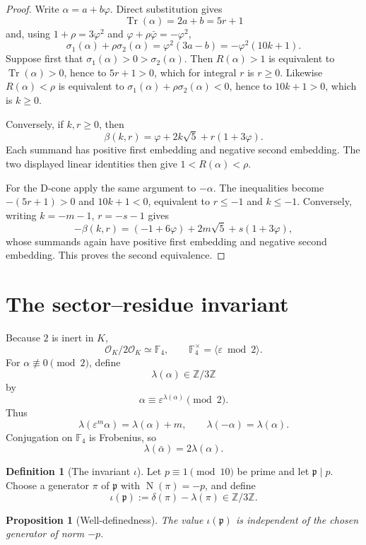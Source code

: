 \documentclass[12pt]{amsart}
\newtheorem{proposition}[theorem]{Proposition}
\theoremstyle{definition}
\newtheorem{definition}[theorem]{Definition}
\theoremstyle{remark}
\DeclareMathOperator{\N}{N}
\DeclareMathOperator{\Tr}{Tr}
\newcommand{\ZZ}{\mathbb{Z}}
\newcommand{\FF}{\mathbb{F}}
\newcommand{\OK}{\mathcal{O}_K}
\newcommand{\eps}{\varepsilon}
\newcommand{\ph}{\varphi}
\begin{document}
\begin{proof}
Write $\alpha=a+b\ph$.  Direct substitution gives
\[
  \Tr(\alpha)=2a+b=5r+1
\]
and, using $1+\rho=3\ph^2$ and
$\ph+\rho\bar\ph=-\ph^2$,
\[
  \sigma_1(\alpha)+\rho\sigma_2(\alpha)
  =\ph^2(3a-b)=-\ph^2(10k+1).
\]
Suppose first that $\sigma_1(\alpha)>0>\sigma_2(\alpha)$.  Then
$R(\alpha)>1$ is equivalent to
$\Tr(\alpha)>0$, hence to $5r+1>0$, which for integral $r$ is
$r\geq0$.  Likewise $R(\alpha)<\rho$ is equivalent to
$\sigma_1(\alpha)+\rho\sigma_2(\alpha)<0$, hence to
$10k+1>0$, which is $k\geq0$.

Conversely, if $k,r\geq0$, then
\[
  \beta(k,r)=\ph+2k\sqrt5+r(1+3\ph).
\]
Each summand has positive first embedding and negative second
embedding.  The two displayed linear identities then give
$1<R(\alpha)<\rho$.

For the D-cone apply the same argument to $-\alpha$.  The inequalities
become $-(5r+1)>0$ and $10k+1<0$, equivalent to
$r\leq-1$ and $k\leq-1$.  Conversely, writing
$k=-m-1$, $r=-s-1$ gives
\[
  -\beta(k,r)=(-1+6\ph)+2m\sqrt5+s(1+3\ph),
\]
whose summands again have positive first embedding and negative second
embedding.  This proves the second equivalence.
\end{proof}

\section{The sector--residue invariant}\label{sec:iota}

Because $2$ is inert in $K$,
\[
  \OK/2\OK\simeq\FF_4,
  \qquad
  \FF_4^\times=\langle\eps\bmod2\rangle.
\]
For $\alpha\not\equiv0\pmod2$, define
\[
  \lambda(\alpha)\in\ZZ/3\ZZ
\]
by
\[
  \alpha\equiv\eps^{\lambda(\alpha)}\pmod2.
\]
Thus
\[
  \lambda(\eps^m\alpha)=\lambda(\alpha)+m,
  \qquad
  \lambda(-\alpha)=\lambda(\alpha).
\]
Conjugation on $\FF_4$ is Frobenius, so
\[
  \lambda(\bar\alpha)=2\lambda(\alpha).
\]

\begin{definition}[The invariant $\iota$]\label{def:iota}
Let $p\equiv1\pmod{10}$ be prime and let
$\mathfrak p\mid p$.  Choose a generator $\pi$ of $\mathfrak p$ with
$\N(\pi)=-p$, and define
\[
  \iota(\mathfrak p)
  :=\delta(\pi)-\lambda(\pi)\in\ZZ/3\ZZ.
\]
\end{definition}

\begin{proposition}[Well-definedness]\label{prop:iota-wd}
The value $\iota(\mathfrak p)$ is independent of the chosen generator
of norm $-p$.
\end{proposition}
\end{document}
